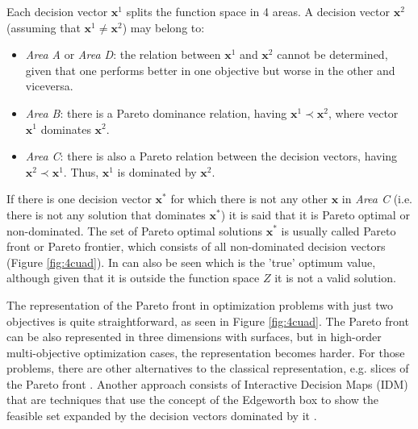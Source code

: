     Each decision vector $\bm{x}^1$ splits the function space in 4 areas. A decision vector $\bm{x}^2$ (assuming that $\bm{x}^1 \neq \bm{x}^2$) may belong to:
    \begin{itemize}
        \item \textit{Area A} or \textit{Area D}: the relation between $\bm{x}^1$ and $\bm{x}^2$ cannot be determined, given that one performs better in one objective but worse in the other and viceversa.
        \item \textit{Area B}: there is a Pareto dominance relation, having $\bm{x}^1 \prec \bm{x}^2$, where vector $\bm{x}^1$ dominates $\bm{x}^2$.
        \item \textit{Area C}: there is also a Pareto relation between the decision vectors, having $\bm{x}^2 \prec \bm{x}^1$. Thus, $\bm{x}^1$ is dominated by $\bm{x}^2$.
    \end{itemize}
    
    \newpage
    
    If there is one decision vector $\bm{x}^*$ for which there is not any other $\bm{x}$ in \textit{Area C} (i.e. there is not any solution that dominates $\bm{x}^*$) it is said that it is Pareto optimal or non-dominated. The set of Pareto optimal solutions $\bm{x}^*$ is usually called Pareto front or Pareto frontier, which consists of all non-dominated decision vectors (Figure \ref{fig:4cuad}). In can also be seen which is the 'true' optimum value, although given that it is outside the function space $Z$ it is not a valid solution.
    
    The representation of the Pareto front in optimization problems with just two objectives is quite straightforward, as seen in Figure \ref{fig:4cuad}. The Pareto front can be also represented in three dimensions with surfaces, but in high-order multi-objective optimization cases, the representation becomes harder. For those problems, there are other alternatives to the classical representation, e.g. slices of the Pareto front \cite{jaini2017fuzzy} \cite{triantaphyllou2000multi}. Another approach consists of Interactive Decision Maps (IDM) that are techniques that use the concept of the Edgeworth box to show the feasible set expanded by the decision vectors dominated by it \cite{lotov2013interactive}.
    
